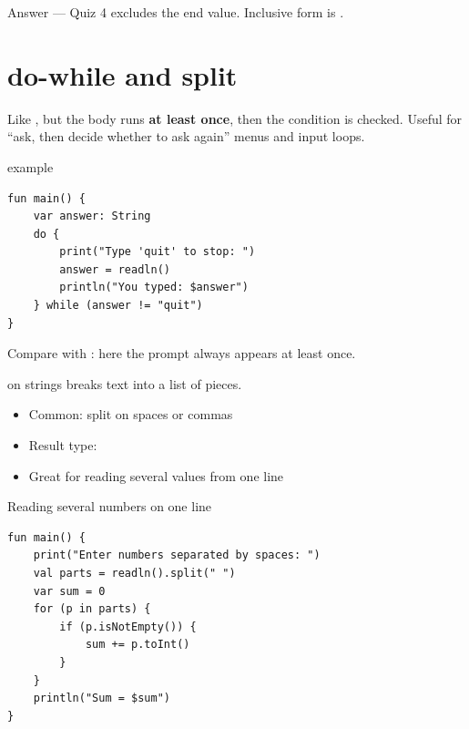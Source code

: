 \documentclass[aspectratio=169,11pt]{beamer}
\begin{document}
    \begin{frame}{Answer --- Quiz 4}
        \vspace{0.4em}
         excludes the end value. Inclusive form is .
    \end{frame}

    \section{do-while and split}

    \begin{frame}{}
        Like , but the body runs \textbf{at least once},
        then the condition is checked.
        \vspace{0.5em}
        Useful for ``ask, then decide whether to ask again'' menus and input loops.
    \end{frame}

    \begin{frame}[fragile]{ example}
        \begin{lstlisting}
fun main() {
    var answer: String
    do {
        print("Type 'quit' to stop: ")
        answer = readln()
        println("You typed: $answer")
    } while (answer != "quit")
}
        \end{lstlisting}
        \vspace{0.3em}
        Compare with : here the prompt always appears at least once.
    \end{frame}

    \begin{frame}{ on strings}
         breaks text into a list of pieces.
        \vspace{0.5em}
        \begin{itemize}
            \item Common: split on spaces or commas
            \item Result type: 
            \item Great for reading several values from one line
        \end{itemize}
    \end{frame}

    \begin{frame}[fragile]{Reading several numbers on one line}
        \begin{lstlisting}
fun main() {
    print("Enter numbers separated by spaces: ")
    val parts = readln().split(" ")
    var sum = 0
    for (p in parts) {
        if (p.isNotEmpty()) {
            sum += p.toInt()
        }
    }
    println("Sum = $sum")
}
        \end{lstlisting}
    \end{frame}
\end{document}
